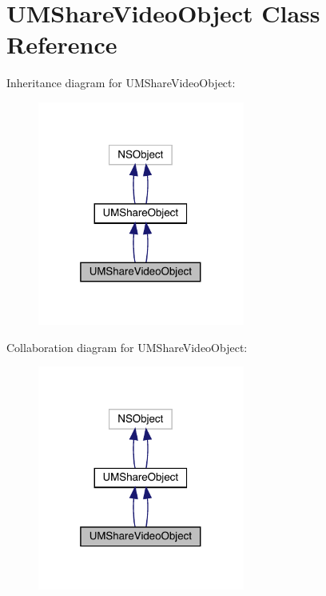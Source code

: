 \hypertarget{interface_u_m_share_video_object}{}\section{U\+M\+Share\+Video\+Object Class Reference}
\label{interface_u_m_share_video_object}


Inheritance diagram for U\+M\+Share\+Video\+Object\+:\nopagebreak
\begin{figure}[H]
\begin{center}
\leavevmode
\includegraphics[width=193pt]{interface_u_m_share_video_object__inherit__graph}
\end{center}
\end{figure}


Collaboration diagram for U\+M\+Share\+Video\+Object\+:\nopagebreak
\begin{figure}[H]
\begin{center}
\leavevmode
\includegraphics[width=193pt]{interface_u_m_share_video_object__coll__graph}
\end{center}
\end{figure}
